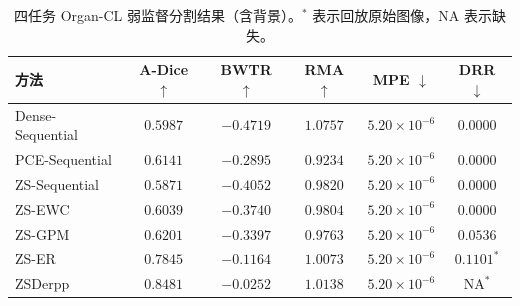 \begin{table}[htbp]
\centering
\setlength{\belowcaptionskip}{5pt}
\caption{四任务 Organ-CL 弱监督分割结果（含背景）。$^{*}$ 表示回放原始图像，NA 表示缺失。}
\label{tab:scribblecl-organ-results}
\linespread{1}\selectfont
\thesistablefont
\renewcommand{\arraystretch}{1.14}
\setlength{\tabcolsep}{2pt}
\begin{tabular*}{\textwidth}{@{\extracolsep{\fill}}lccccc@{}}
\toprule
方法 & A-Dice $\uparrow$ & BWTR $\uparrow$ & RMA $\uparrow$ & MPE $\downarrow$ & DRR $\downarrow$ \\
\midrule
Dense-Sequential & $0.5987$ & $-0.4719$ & $1.0757$ & $5.20\times10^{-6}$ & $0.0000$ \\
PCE-Sequential & $0.6141$ & $-0.2895$ & $0.9234$ & $5.20\times10^{-6}$ & $0.0000$ \\
ZS-Sequential & $0.5871$ & $-0.4052$ & $0.9820$ & $5.20\times10^{-6}$ & $0.0000$ \\
ZS-EWC & $0.6039$ & $-0.3740$ & $0.9804$ & $5.20\times10^{-6}$ & $0.0000$ \\
ZS-GPM & $0.6201$ & $-0.3397$ & $0.9763$ & $5.20\times10^{-6}$ & $0.0536$ \\
ZS-ER & $0.7845$ & $-0.1164$ & $1.0073$ & $5.20\times10^{-6}$ & $0.1101^{*}$ \\
ZSDerpp & $0.8481$ & $-0.0252$ & $1.0138$ & $5.20\times10^{-6}$ & $\mathrm{NA}^{*}$ \\
\bottomrule
\end{tabular*}
\end{table}
